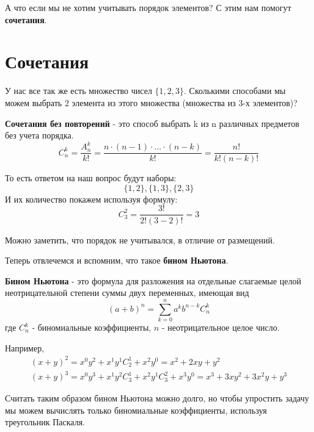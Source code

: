 А что если мы не хотим учитывать порядок элементов? С этим нам помогут \textbf{сочетания}.
\section{Сочетания}
У нас все так же есть множество чисел $\{1, 2, 3\}$. Сколькими способами мы можем выбрать 2 элемента из 
этого множества (множества из 3-х элементов)?

\begin{utv}
    \textbf{Сочетания без повторений} - это способ выбрать k из n различных предметов
    без учета порядка.
    \begin{equation}
        C^k_n = \frac{A^k_n}{k!} = \frac{n \cdot (n-1) \cdot ... \cdot (n-k)}{k!} = \frac{n!}{k!(n-k)!}
    \end{equation}
\end{utv}
То есть ответом на наш вопрос будут наборы:
\begin{equation*}
    \{1, 2\}, \{1, 3\}, \{2, 3\}
\end{equation*}
И их количество покажем используя формулу:
\begin{equation*}
    C^2_3 = \frac{3!}{2!(3-2)!} = 3
\end{equation*}

Можно заметить, что порядок не учитывался, в отличие от размещений.

Теперь отвлечемся и вспомним, что такое \textbf{бином Ньютона}.
\begin{utv}
    \textbf{Бином Ньютона} - это формула для разложения на отдельные слагаемые целой
    неотрицательной степени суммы двух переменных, имеющая вид
    \begin{equation}
        (a + b)^n = \sum_{k = 0}^{n} a^k b^{n-k} C^k_n 
    \end{equation}
    где $C^k_n$ - биномиальные коэффициенты, $n$ - неотрицательное целое число.
\end{utv}
Например,
\begin{gather}\label{binom_examples}
    (x + y)^2 = x^0y^2 + x^1y^1C^1_2 + x^2y^0 = x^2 + 2xy + y^2 \\
    (x + y)^3 =  x^0y^3 + x^1y^2C^1_3 + x^2y^1C^2_3 + x^3y^0 = x^3 + 3xy^2 + 3x^2y + y^3
\end{gather}

Считать таким образом бином Ньютона можно долго, но чтобы упростить задачу
мы можем вычислять только биномиальные коэффициенты, используя треугольник Паскаля.

